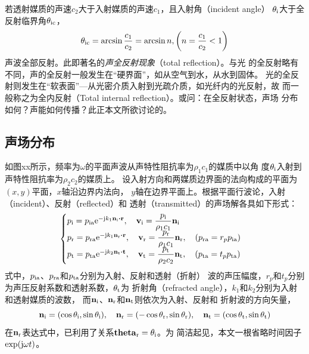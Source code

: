 \documentclass[UTF8]{ctexbook}
\begin{document}
若透射媒质的声速$c_2$大于入射媒质的声速$c_1$，且入射角（incident angle）
$\theta_\text{i}$大于全反射临界角$\theta_\text{ic}$，
\begin{equation}
\theta_\text{ic} = \arcsin \frac{c_1}{c_2} = \arcsin n, \qty(n=\frac{c_1}{c_2}
<1)
\end{equation}
声波全部反射。此即著名的\emph{声全反射现象}（total reflection）。与光
的全反射略有不同，声的全反射一般发生在“硬界面”，如从空气到水，从水到固体。
光的全反射则发生在“软表面”---从光密介质入射到光疏介质，如光纤内的光反射，故
而一般称之为全内反射（Total internal reflection）。或问：在全反射状态，声场
分布如何？声能如何传播？此正本文所欲讨论的。

\subsection{声场分布}
如图xx所示，频率为$\omega$的平面声波从声特性阻抗率为$\rho_1c_1$的媒质中以角
度$\theta_\text{i}$入射到声特性阻抗率为$\rho_2c_2$的媒质上。
设入射方向和两媒质边界面的法向构成的平面为$(x,y)$平面，$x$轴沿边界内法向，
$y$轴在边界平面上。根据平面行波论，入射（incident）、反射（reflected）和
透射（transmitted）的声场解各具如下形式：
\begin{equation}
	\label{eq:totalref_pressure}
	\begin{cases}
	p\st{i} = p\st{ia} \me^{-\mj k_1 \vb{n}\st{i} \vdot \vb{r}}
	\qc \vb{v}\st{i} = \dfrac{p\st{i}}{\rho_1c_1} \vb{n}\st{i}\\
	p\st{r} = p\st{ra} \me^{-\mj k_1 \vb{n}\st{r} \vdot \vb{r}}
	\qc \vb{v}\st{r} = \dfrac{p\st{r}}{\rho_1c_1} \vb{n}\st{r}
	\qc (p\st{ra} = r_p p\st{ia}) \\
	p\st{t} = p\st{ta} \me^{-\mj k_2 \vb{n}\st{t} \vdot \vb{t}}
	\qc \vb{v}\st{t} = \dfrac{p\st{t}}{\rho_2c_2} \vb{n}\st{t}
	\qc (p\st{ta} = t_p p\st{ta}) 
	\end{cases}
\end{equation}
式中，$p_\text{ia}$、$p_\text{ra}$和$p_\text{ta}$分别为入射、反射和透射（折射）
波的声压幅度，$r_p$和$t_p$分别为声压反射系数和透射系数，$\theta_\text{t}$为
折射角（refracted angle），$k_1$和$k_2$分别为入射和透射媒质的波数，
而$\vb{n}_\text{i}$、$\vb{n}_\text{r}$和$\vb{n}_\text{t}$则依次为入射、反射和
折射波的方向矢量，
\begin{equation}
	\label{eq:totalref_n}
	\vb{n}\st{i}=(\cos \theta\st{i}, \sin \theta\st{i})\qc 
	\vb{n}\st{r}=(-\cos \theta\st{r}, \sin \theta\st{r})\qc 
	\vb{n}\st{t}=(\cos \theta\st{t}, \sin \theta\st{t})
\end{equation}
在$\vb{n}_\text{r}$表达式中，已利用了关系$\vb{theta}_\text{r}=\theta_\text{i}$。为
简洁起见，本文一根省略时间因子$\exp(\mathrm{j} \omega t)$。
\end{document}
